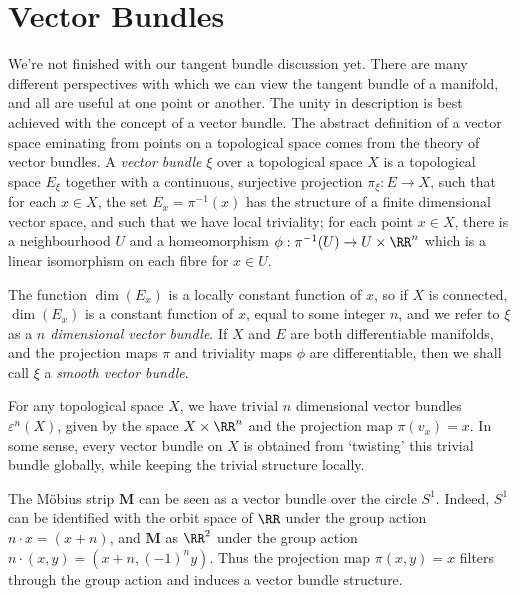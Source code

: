 \section{Vector Bundles}

We're not finished with our tangent bundle discussion yet. There are many different perspectives with which we can view the tangent bundle of a manifold, and all are useful at one point or another. The unity in description is best achieved with the concept of a vector bundle. The abstract definition of a vector space eminating from points on a topological space comes from the theory of vector bundles. A \emph{vector bundle} $\xi$ over a topological space $X$ is a topological space $E_\xi$ together with a continuous, surjective projection $\pi_\xi: E \to X$, such that for each $x \in X$, the set $E_x = \pi^{-1}(x)$ has the structure of a finite dimensional vector space, and such that we have local triviality; for each point $x \in X$, there is a neighbourhood $U$ and a homeomorphism $\phi: \pi^{-1}(U) \to U \times \RR^n$ which is a linear isomorphism on each fibre for $x \in U$.

The function $\dim(E_x)$ is a locally constant function of $x$, so if $X$ is connected, $\dim(E_x)$ is a constant function of $x$, equal to some integer $n$, and we refer to $\xi$ as a \emph{$n$ dimensional vector bundle}. If $X$ and $E$ are both differentiable manifolds, and the projection maps $\pi$ and triviality maps $\phi$ are differentiable, then we shall call $\xi$ a \emph{smooth vector bundle}.

\begin{example}
    For any topological space $X$, we have trivial $n$ dimensional vector bundles $\varepsilon^n(X)$, given by the space $X \times \RR^n$ and the projection map $\pi(v_x) = x$. In some sense, every vector bundle on $X$ is obtained from `twisting' this trivial bundle globally, while keeping the trivial structure locally.
\end{example}

\begin{example}
    The M\"{o}bius strip $\mathbf{M}$ can be seen as a vector bundle over the circle $S^1$. Indeed, $S^1$ can be identified with the orbit space of $\RR$ under the group action $n \cdot x = (x + n)$, and $\mathbf{M}$ as $\RR^2$ under the group action $n \cdot (x,y) = (x + n, (-1)^n y)$. Thus the projection map $\pi(x,y) = x$ filters through the group action and induces a vector bundle structure.
\end{example}

